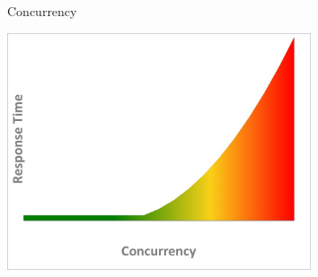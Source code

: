 \begin{frame}[fragile]{Concurrency}
  \begin{center}
    \includegraphics[height=7cm,keepaspectratio]{sources/images/response_time.jpg}
  \end{center}
\end{frame}

